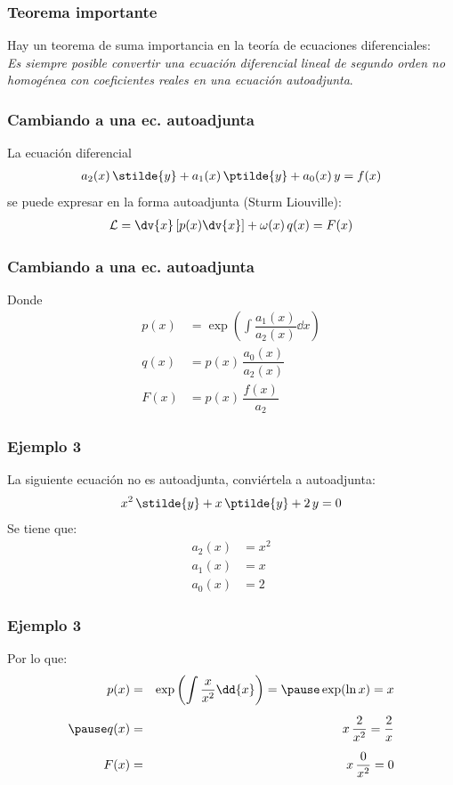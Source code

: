 \begin{frame}
\frametitle{Teorema importante}
Hay un teorema de suma importancia en la teoría de ecuaciones diferenciales:
\\
\bigskip
\emph{Es siempre posible convertir una ecuación diferencial lineal de segundo orden no homogénea con coeficientes reales en una ecuación autoadjunta}.
\end{frame}
\begin{frame}
\frametitle{Cambiando a una ec. autoadjunta}
La ecuación diferencial
\begin{align*}
a_{2}(x) \, \stilde{y} + a_{1}(x) \, \ptilde{y} + a_{0} (x) \, y =  f(x)
\end{align*}
se puede expresar en la forma autoadjunta (Sturm Liouville):
\begin{align*}
\mathcal{L} = \dv{x} \left[ p(x) \dv{x} \right] + \omega (x) \, q(x) =  F(x)
\end{align*}    
\end{frame}
\begin{frame}
\frametitle{Cambiando a una ec. autoadjunta}
Donde 
\begin{align*}
p(x) &=  \exp\left( \int \dfrac{a_{1}(x)}{a_{2}(x)} \dd{x} \right) \\[0.5em]
q(x) &= p(x) \, \dfrac{a_{0}(x)}{a_{2}(x)} \\[0.5em]
F(x) &= p(x) \, \dfrac{f(x)}{a_{2}}
\end{align*}
\end{frame}
\begin{frame}
\frametitle{Ejemplo 3}
La siguiente ecuación no es autoadjunta, conviértela a autoadjunta:
\begin{align*}
x^{2} \, \stilde{y} + x \, \ptilde{y} + 2 \, y = 0
\end{align*}
\pause
Se tiene que:
\begin{align*}
a_{2}(x) &= x^{2} \\[0.5em]
a_{1}(x) &= x \\[0.5em]
a_{0}(x) &= 2
\end{align*}
\end{frame}
\begin{frame}
\frametitle{Ejemplo 3}
Por lo que:
\begin{eqnarray*}
p(x) &=&  \exp\left( \int \dfrac{x}{x^{2}} \dd{x} \right) = \pause \exp(\ln x) =  x \\[0.5em] \pause
q(x) &=& x \, \dfrac{2}{x^{2}} = \dfrac{2}{x} \\[0.5em]
F(x) &=& x \, \dfrac{0}{x^{2}} = 0
\end{eqnarray*}
\end{frame}
